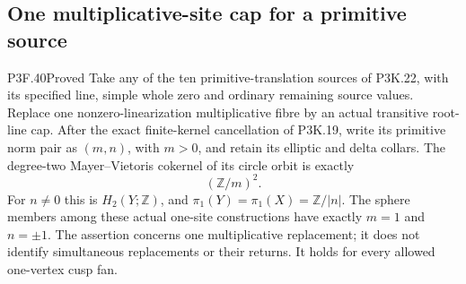 \subsection{One multiplicative-site cap for a primitive source}
\begin{statement}{P3F.40}{Proved}
Take any of the ten primitive-translation sources of P3K.22,
with its specified line, simple whole zero and ordinary remaining
source values. Replace one nonzero-linearization multiplicative
fibre by an actual transitive root-line cap. After the exact
finite-kernel cancellation of P3K.19, write its primitive norm
pair as $(m,n)$, with $m>0$, and retain its elliptic and delta
collars. The degree-two Mayer--Vietoris cokernel of its circle
orbit is exactly
\[
                         (\mathbb Z/m)^2.              \tag{F40.1}
\]
For $n\ne0$ this is $H_2(Y;\mathbb Z)$, and
$\pi_1(Y)=\pi_1(X)=\mathbb Z/|n|$. The sphere members among
these actual one-site constructions have exactly $m=1$ and
$n=\pm1$. The assertion concerns one multiplicative replacement;
it does not identify simultaneous replacements or their returns.
It holds for every allowed one-vertex cusp fan.
\end{statement}
